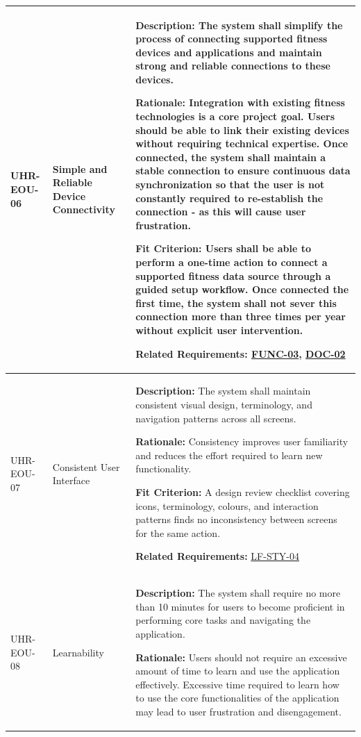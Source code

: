 \documentclass[12pt]{article}
\begin{document}
\begin{xltabular}{\textwidth}{|p{2.6cm}|p{3.4cm}|X|}
UHR-EOU-06\hypertarget{req:UHR-EOU-06}{} & 
Simple and Reliable Device Connectivity & 
\textbf{Description:} The system shall simplify the process of connecting supported fitness devices and applications and maintain strong and reliable connections to these devices. 

\textbf{Rationale:} Integration with existing fitness technologies is a core project goal. Users should be able to link their existing devices without requiring technical expertise. Once connected, the system shall maintain a stable connection to ensure continuous data synchronization so that the user is not constantly required to re-establish the connection - as this will cause user frustration.

\textbf{Fit Criterion:} Users shall be able to perform a one-time action to connect a supported fitness data source through a guided setup workflow. Once connected the first time, the system shall not sever this connection more than three times per year without explicit user intervention.

\textbf{Related Requirements:} \hyperlink{req:FUNC-03}{FUNC-03}, \hyperlink{req:DOC-02}{DOC-02}\\
\hline

UHR-EOU-07\hypertarget{req:UHR-EOU-07}{} & 
Consistent User Interface & 
\textbf{Description:} The system shall maintain consistent visual design, terminology, and navigation patterns across all screens. 

\textbf{Rationale:} Consistency improves user familiarity and reduces the effort required to learn new functionality. 

\textbf{Fit Criterion:} A design review checklist covering icons, terminology, colours, and interaction patterns finds no inconsistency between screens for the same action.

\textbf{Related Requirements:} \hyperlink{req:LF-STY-04}{LF-STY-04}\\
\hline

UHR-EOU-08\hypertarget{req:UHR-EOU-08}{} & 
Learnability & 
\textbf{Description:} The system shall require no more than 10 minutes for users to become proficient in performing core tasks and navigating the application. 

\textbf{Rationale:} Users should not require an excessive amount of time to learn and use the application effectively. Excessive time required to learn how to use the core functionalities of the application may lead to user frustration and disengagement.


\end{xltabular}
\end{document}
